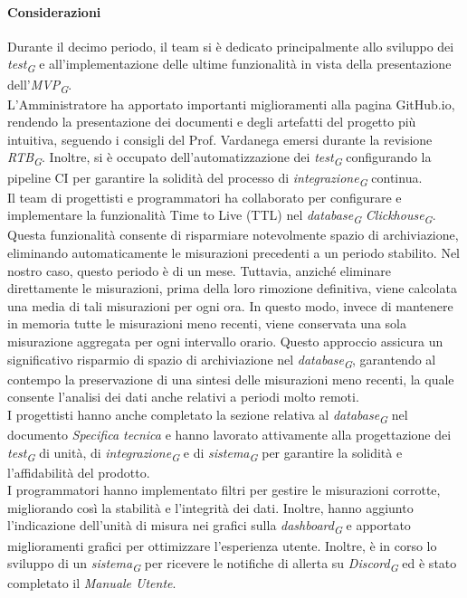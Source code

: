 \paragraph{Considerazioni}
Durante il decimo periodo, il team si è dedicato principalmente allo sviluppo dei \textit{test}\textsubscript{\textit{G}} e all'implementazione delle ultime funzionalità in vista della presentazione dell'\textit{MVP}\textsubscript{\textit{G}}. \\
L'Amministratore ha apportato importanti miglioramenti alla pagina GitHub.io, rendendo la presentazione dei documenti e degli artefatti del progetto più intuitiva, seguendo i consigli del Prof. Vardanega emersi durante la revisione \textit{RTB}\textsubscript{\textit{G}}. Inoltre, si è occupato dell'automatizzazione dei \textit{test}\textsubscript{\textit{G}} configurando la pipeline CI per garantire la solidità del processo di \textit{integrazione}\textsubscript{\textit{G}} continua. \\
Il team di progettisti e programmatori ha collaborato per configurare e implementare la funzionalità Time to Live (TTL) nel \textit{database}\textsubscript{\textit{G}} \textit{Clickhouse}\textsubscript{\textit{G}}. Questa funzionalità consente di risparmiare notevolmente spazio di archiviazione, eliminando automaticamente le misurazioni precedenti a un periodo stabilito. Nel nostro caso, questo periodo è di un mese. Tuttavia, anziché eliminare direttamente le misurazioni, prima della loro rimozione definitiva, viene calcolata una media di tali misurazioni per ogni ora. In questo modo, invece di mantenere in memoria tutte le misurazioni meno recenti, viene conservata una sola misurazione aggregata per ogni intervallo orario. Questo approccio assicura un significativo risparmio di spazio di archiviazione nel \textit{database}\textsubscript{\textit{G}}, garantendo al contempo la preservazione di una sintesi delle misurazioni meno recenti, la quale consente l'analisi dei dati anche relativi a periodi molto remoti. \\
I progettisti hanno anche completato la sezione relativa al \textit{database}\textsubscript{\textit{G}} nel documento \textit{Specifica tecnica} e hanno lavorato attivamente alla progettazione dei \textit{test}\textsubscript{\textit{G}} di unità, di \textit{integrazione}\textsubscript{\textit{G}} e di \textit{sistema}\textsubscript{\textit{G}} per garantire la solidità e l'affidabilità del prodotto. \\
I programmatori hanno implementato filtri per gestire le misurazioni corrotte, migliorando così la stabilità e l'integrità dei dati. Inoltre, hanno aggiunto l'indicazione dell'unità di misura nei grafici sulla \textit{dashboard}\textsubscript{\textit{G}} e apportato miglioramenti grafici per ottimizzare l'esperienza utente. Inoltre, è in corso lo sviluppo di un \textit{sistema}\textsubscript{\textit{G}} per ricevere le notifiche di allerta su \textit{Discord}\textsubscript{\textit{G}} ed è stato completato il \textit{Manuale Utente}. \\
